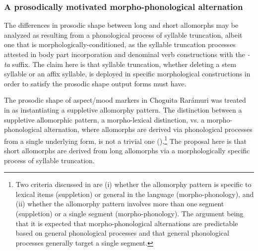 \ea\label{ex: short-short sequences}

    \z
\z

\subsubsection{A prosodically motivated morpho-phonological alternation}
\label{subsubsec: a prosodically motivated morphophonological alternation}

The differences in prosodic shape between long and short allomorphs may be analyzed as resulting from a phonological process of syllable truncation, albeit one that is morphologically-conditioned, as the syllable truncation processes attested in body part incorporation and denominal verb constructions with the \textit{-ta} suffix. The claim here is that syllable truncation, whether deleting a stem syllable or an affix syllable, is deployed in specific morphological constructions in order to satisfy the prosodic shape output forms must have.

The prosodic shape of aspect/mood markers in Choguita Rarámuri was treated in \citet{caballero2008choguita} as instantiating a suppletive allomorphy pattern. The distinction between a suppletive allomorphic pattern, a morpho-lexical distinction, vs. a morpho-phonological alternation, where allomorphs are derived via phonological processes from a single underlying form, is not a trivial one (\citealt{kiparsky1996allomorphy,paster2006phonological}).\footnote{Two criteria discussed in \citet{kiparsky1996allomorphy} are (i) whether the allomorphy pattern is specific to lexical items (suppletion) or general in the language (morpho-phonology), and (ii) whether the allomorphy pattern involves more than one segment (suppletion) or a single segment (morpho-phonology). The argument being that it is expected that morpho-phonological alternations are predictable based on general phonological processes and that general phonological processes generally target a single segment.} The proposal here is that short allomorphs are derived from long allomorphs via a morphologically specific process of syllable truncation.

